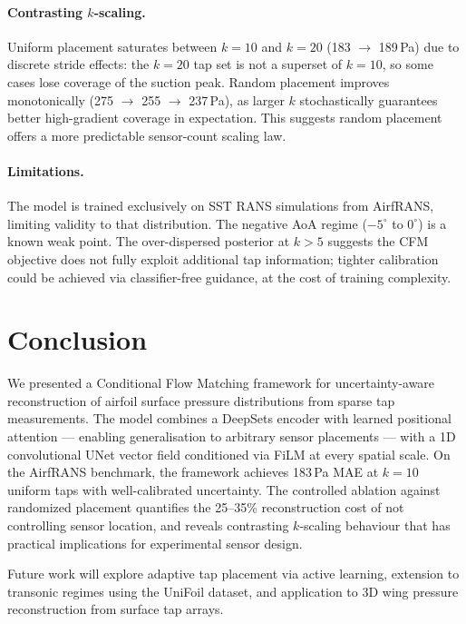 \documentclass[12pt]{article}
\begin{document}
\paragraph{Contrasting $k$-scaling.}
Uniform placement saturates between $k=10$ and $k=20$ (183 $\to$ 189\,Pa) due
to discrete stride effects: the $k=20$ tap set is not a superset of $k=10$, so
some cases lose coverage of the suction peak. Random placement improves
monotonically (275 $\to$ 255 $\to$ 237\,Pa), as larger $k$ stochastically
guarantees better high-gradient coverage in expectation. This suggests random
placement offers a more predictable sensor-count scaling law.

\paragraph{Limitations.}
The model is trained exclusively on SST RANS simulations from AirfRANS, limiting
validity to that distribution. The negative AoA regime ($-5^\circ$ to $0^\circ$)
is a known weak point. The over-dispersed posterior at $k > 5$ suggests the CFM
objective does not fully exploit additional tap information; tighter calibration
could be achieved via classifier-free guidance, at the cost of training complexity.

\section{Conclusion}
\label{sec:conclusion}

We presented a Conditional Flow Matching framework for uncertainty-aware
reconstruction of airfoil surface pressure distributions from sparse tap
measurements. The model combines a DeepSets encoder with learned positional
attention — enabling generalisation to arbitrary sensor placements — with a
1D convolutional UNet vector field conditioned via FiLM at every spatial scale.
On the AirfRANS benchmark, the framework achieves 183\,Pa MAE at $k=10$ uniform
taps with well-calibrated uncertainty. The controlled ablation against randomized
placement quantifies the 25--35\% reconstruction cost of not controlling sensor
location, and reveals contrasting $k$-scaling behaviour that has practical
implications for experimental sensor design.

Future work will explore adaptive tap placement via active learning, extension to
transonic regimes using the UniFoil dataset, and application to 3D wing pressure
reconstruction from surface tap arrays.

\newpage


\end{document}
